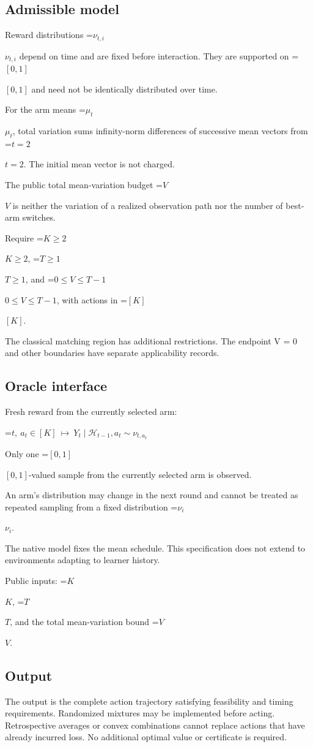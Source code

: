 \documentclass[10pt,a4paper]{article}
\newcommand{\AtlasMath}[1]{\par\begingroup\centering\setbox0=\hbox{$\displaystyle #1$}\ifdim\wd0>1.4\linewidth\typeout{ATLAS WIDE FORMULA: \the\wd0}\fi\ifdim\wd0>\linewidth\resizebox{\linewidth}{!}{\box0}\else\box0\fi\par\endgroup}
\newcommand{\AtlasInlineMath}[1]{\begingroup\setbox0=\hbox{$#1$}\ifdim\wd0>.4\linewidth\endgroup\AtlasMath{#1}\else\endgroup$#1$\fi}
\begin{document}
\subsection{Admissible model}
Reward distributions \AtlasInlineMath{\nu_{t,i}} depend on time and are fixed before interaction. They are supported on \AtlasInlineMath{[0,1]} and need not be identically distributed over time.

For the arm means \AtlasInlineMath{\mu_t}, total variation sums infinity-norm differences of successive mean vectors from \AtlasInlineMath{t=2}. The initial mean vector is not charged.

The public total mean-variation budget \AtlasInlineMath{V} is neither the variation of a realized observation path nor the number of best-arm switches.

Require \AtlasInlineMath{K\ge2}, \AtlasInlineMath{T\ge1}, and \AtlasInlineMath{0\le V\le T-1}, with actions in \AtlasInlineMath{[K]}.

The classical matching region has additional restrictions. The endpoint V = 0 and other boundaries have separate applicability records.

\subsection{Oracle interface}
Fresh reward from the currently selected arm:


\AtlasMath{t,\ a_t\in[K]\ \longmapsto\ Y_t\mid\mathcal{H}_{t-1},a_t\sim\nu_{t,a_t}}


Only one \AtlasInlineMath{[0,1]}-valued sample from the currently selected arm is observed.

An arm's distribution may change in the next round and cannot be treated as repeated sampling from a fixed distribution \AtlasInlineMath{\nu_i}.

The native model fixes the mean schedule. This specification does not extend to environments adapting to learner history.

Public inputs: \AtlasInlineMath{K}, \AtlasInlineMath{T}, and the total mean-variation bound \AtlasInlineMath{V}.

\subsection{Output}
The output is the complete action trajectory satisfying feasibility and timing requirements. Randomized mixtures may be implemented before acting. Retrospective averages or convex combinations cannot replace actions that have already incurred loss. No additional optimal value or certificate is required.
\end{document}
